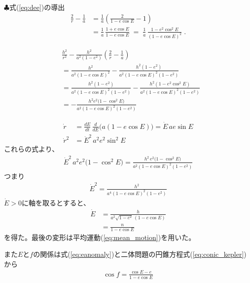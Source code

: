 \begin{itembox}{$\clubsuit$式(\ref{eq:dee})の導出}
\footnotesize
\color{gray}
\begin{align}
  \frac{2}{r}-\frac{1}{a}
    &=\frac{1}{a}\!\left(\frac{2}{1-e\cos E}-1\right)     \nonumber \\
    &=\frac{1}{a}\,\frac{1+e\cos E}{1-e\cos E}
      \;=\;
      \frac{1}{a}\,
      \frac{1-e^{2}\cos^{2}E}{(1-e\cos E)^{2}}\;.
\end{align}

\begin{align}
 &\frac{h^{2}}{r^{2}}
 -\frac{h^{2}}{a^{2}(1-e^{2})}\!
  \left(\frac{2}{r}-\frac{1}{a}\right) \nonumber \\
 &= \frac{h^{2}}{a^{2}(1-e\cos E)^{2}}
    -\frac{h^{2}(1-e^{2})}{a^{2}(1-e\cos E)^{2}(1-e^{2})} \nonumber \\
 &=\frac{h^{2}(1-e^{2})}{a^{2}(1-e\cos E)^{2}(1-e^{2})} -\frac{h^{2}(1-e^{2}\cos^{2}E)}{a^{2}(1-e\cos E)^{2}(1-e^{2})}\nonumber \\
 &= -\frac{h^{2}e^{2}\bigl(1-\cos^{2}E\bigr)}
        {a^{2}(1-e\cos E)^{2}(1-e^{2})}
\end{align}

\begin{align}
     \dot r &=\frac{dE}{dt}\,
         \frac{d}{dE}\bigl(a(1-e\cos E)\bigr)
     =\dot E\,a e\sin E \\
  \dot r^{2}
    &=\dot E^{2}\,a^{2}e^{2}\sin^{2}E
\end{align}
これらの式より、
\begin{align}
    \dot E^{2}\,a^{2}e^{2}\bigl(1-\cos^{2}E\bigr)
  =
  \frac{h^{2}\,e^{2}\bigl(1-\cos^{2}E\bigr)}
       {a^{2}(1-e\cos E)^{2}(1-e^{2})}
\end{align}
つまり
\begin{align}
    \dot E^{2}
   =\frac{h^{2}}
          {a^{4}(1-e\cos E)^{2}(1-e^{2})}
\end{align}
$\dot{E} > 0$に軸を取るとすると、
\begin{align}
    \dot E
 &=\frac{h}{a^{2}\sqrt{1-e^{2}}\,(1-e\cos E)} \\
 & = \frac{n}{1 - e \cos{E}}
\end{align}
を得た。最後の変形は平均運動(\ref{eq:mean_motion})を用いた。
\end{itembox}

また$E$と$f$の関係は式(\ref{eq:eanomaly})と二体問題の円錐方程式(\ref{eq:conic_kepler})から
\begin{align}
\label{eq:Efrel}
\cos{f} = \frac{\cos{E} - e}{1 - e \cos{E}}
\end{align}

